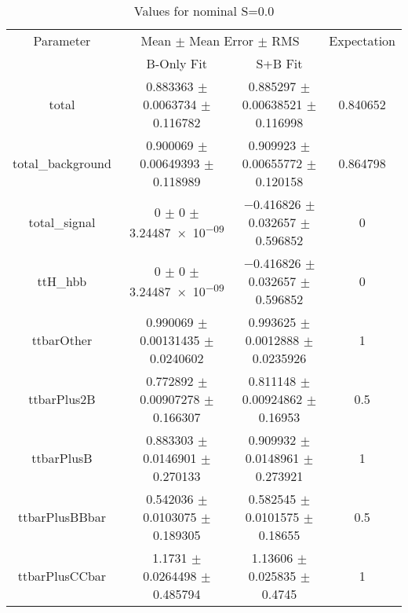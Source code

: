 \begin{table}
\centering
\caption{Values for nominal S=0.0}
\begin{tabular}{cccc}
\toprule
Parameter & \multicolumn{2}{c}{Mean $\pm$ Mean Error $\pm$ RMS} & Expectation\\
 & B-Only Fit & S+B Fit & \\
\midrule
total & \num{0.883363} $\pm$ \num{0.0063734} $\pm$ \num{0.116782} & \num{0.885297} $\pm$ \num{0.00638521} $\pm$ \num{0.116998} & \num{0.840652}\\
total\_background & \num{0.900069} $\pm$ \num{0.00649393} $\pm$ \num{0.118989} & \num{0.909923} $\pm$ \num{0.00655772} $\pm$ \num{0.120158} & \num{0.864798}\\
total\_signal & \num{0} $\pm$ \num{0} $\pm$ \num{3.24487e-09} & \num{-0.416826} $\pm$ \num{0.032657} $\pm$ \num{0.596852} & \num{0}\\
ttH\_hbb & \num{0} $\pm$ \num{0} $\pm$ \num{3.24487e-09} & \num{-0.416826} $\pm$ \num{0.032657} $\pm$ \num{0.596852} & \num{0}\\
ttbarOther & \num{0.990069} $\pm$ \num{0.00131435} $\pm$ \num{0.0240602} & \num{0.993625} $\pm$ \num{0.0012888} $\pm$ \num{0.0235926} & \num{1}\\
ttbarPlus2B & \num{0.772892} $\pm$ \num{0.00907278} $\pm$ \num{0.166307} & \num{0.811148} $\pm$ \num{0.00924862} $\pm$ \num{0.16953} & \num{0.5}\\
ttbarPlusB & \num{0.883303} $\pm$ \num{0.0146901} $\pm$ \num{0.270133} & \num{0.909932} $\pm$ \num{0.0148961} $\pm$ \num{0.273921} & \num{1}\\
ttbarPlusBBbar & \num{0.542036} $\pm$ \num{0.0103075} $\pm$ \num{0.189305} & \num{0.582545} $\pm$ \num{0.0101575} $\pm$ \num{0.18655} & \num{0.5}\\
ttbarPlusCCbar & \num{1.1731} $\pm$ \num{0.0264498} $\pm$ \num{0.485794} & \num{1.13606} $\pm$ \num{0.025835} $\pm$ \num{0.4745} & \num{1}\\
\bottomrule
\end{tabular}
\end{table}